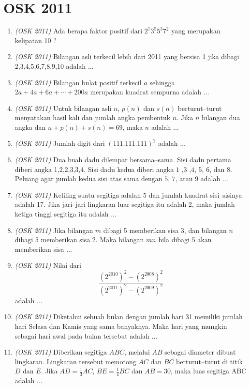 \section{OSK 2011}
\begin{enumerate}
	\item \textit{(OSK 2011)} Ada berapa faktor positif dari $2^7 3^5 5^3 7^2$ yang merupakan kelipatan 10 ?
	\item \textit{(OSK 2011)} Bilangan asli terkecil lebih dari 2011 yang bersisa 1 jika dibagi 2,3,4,5,6,7,8,9,10 adalah $\dots$
	\item \textit{(OSK 2011)} Bilangan bulat positif terkecil $a$ sehingga $2a + 4a + 6a + \cdots + 200a$ merupakan kuadrat sempurna adalah $\dots$
	\item \textit{(OSK 2011)} Untuk bilangan asli $n$, $p(n)$ dan $s(n)$ berturut–turut menyatakan hasil kali dan jumlah angka pembentuk $n$. Jika $n$ bilangan dua angka dan $n + p(n) + s(n) = 69$, maka $n$ adalah $\dots$
	\item \textit{(OSK 2011)} Jumlah digit dari $(111.111.111)^2$ adalah $\dots$
	\item \textit{(OSK 2011)} Dua buah dadu dilempar bersama–sama. Sisi dadu pertama diberi angka 1,2,2,3,3,4. Sisi dadu kedua diberi angka $1$ ,$3$ ,$4$, $5$, $6$, dan $8$. Peluang agar jumlah kedua sisi atas sama dengan $5$, $7$, atau $9$ adalah $\dots$
	
	\item \textit{(OSK 2011)} Keliling suatu segitiga adalah 5 dan jumlah kuadrat sisi–sisinya adalah 17. Jika jari–jari lingkaran luar segitiga itu adalah 2, maka jumlah ketiga tinggi segitiga itu adalah $\dots$
	
	\item \textit{(OSK 2011)} Jika bilangan $m$ dibagi 5 memberikan sisa 3, dan bilangan $n$ dibagi 5 memberikan sisa 2. Maka bilangan $mn$ bila dibagi 5 akan memberikan sisa $\dots$
	\item \textit{(OSK 2011)} Nilai dari  
	\[
	\frac{(2^{2010})^2 - (2^{2008})^2}{(2^{2011})^2 - (2^{2009})^2}
	\]
	adalah $\dots$
	\item \textit{(OSK 2011)} Diketahui sebuah bulan dengan jumlah hari 31 memiliki jumlah hari Selasa dan Kamis yang sama banyaknya. Maka hari yang mungkin sebagai hari awal pada bulan tersebut adalah $\dots$
	
	\item \textit{(OSK 2011)} Diberikan segitiga $ABC$, melalui $AB$ sebagai diameter dibuat lingkaran. Lingkaran tersebut memotong $AC$ dan $BC$ berturut–turut di titik $D$ dan $E$. Jika $AD = \frac13 AC$, $BE = \frac14 BC$ dan $AB = 30$, maka luas segitiga ABC adalah $\dots$
	

\end{enumerate}
